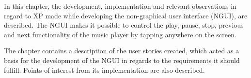In this chapter, the development, implementation and relevant observations in regard to XP made while developing the non-graphical user interface (NGUI), are described. The NGUI makes it possible to control the play, pause, stop, previous and next functionality of the music player by tapping anywhere on the screen.

The chapter contains a description of the user stories created, which acted as a basis for the development of the NGUI in regards to the requirements it should fulfill. Points of interest from its implementation are also described.